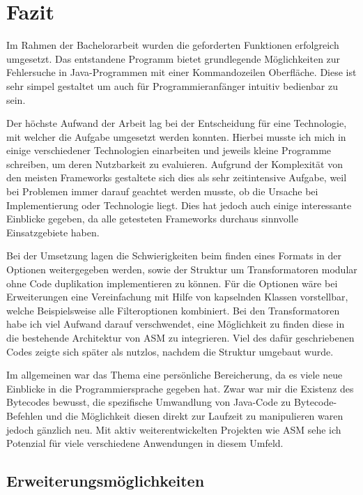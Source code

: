 
\chapter{Fazit}

Im Rahmen der Bachelorarbeit wurden die geforderten Funktionen erfolgreich umgesetzt. Das entstandene Programm bietet grundlegende Möglichkeiten zur Fehlersuche in Java-Programmen mit einer Kommandozeilen Oberfläche. Diese ist sehr simpel gestaltet um auch für Programmieranfänger intuitiv bedienbar zu sein.

Der höchste Aufwand der Arbeit lag bei der Entscheidung für eine Technologie, mit welcher die Aufgabe umgesetzt werden konnten. Hierbei musste ich mich in einige verschiedener Technologien einarbeiten und jeweils kleine Programme schreiben, um deren Nutzbarkeit zu evaluieren. Aufgrund der Komplexität von den meisten Frameworks gestaltete sich dies als sehr zeitintensive Aufgabe, weil bei Problemen immer darauf geachtet werden musste, ob die Ursache bei Implementierung oder Technologie liegt. Dies hat jedoch auch einige interessante Einblicke gegeben, da alle getesteten Frameworks durchaus sinnvolle Einsatzgebiete haben.

Bei der Umsetzung lagen die Schwierigkeiten beim finden eines Formats in der Optionen weitergegeben werden, sowie der Struktur um Transformatoren modular ohne Code duplikation implementieren zu können. Für die Optionen wäre bei Erweiterungen eine Vereinfachung mit Hilfe von kapselnden Klassen vorstellbar, welche Beispielsweise alle Filteroptionen kombiniert. Bei den Transformatoren habe ich viel Aufwand darauf verschwendet, eine Möglichkeit zu finden diese in die bestehende Architektur von ASM zu integrieren. Viel des dafür geschriebenen Codes zeigte sich später als nutzlos, nachdem die Struktur umgebaut wurde.

Im allgemeinen war das Thema eine persönliche Bereicherung, da es viele neue Einblicke in die Programmiersprache gegeben hat. Zwar war mir die Existenz des Bytecodes bewusst, die spezifische Umwandlung von Java-Code zu Bytecode-Befehlen und die Möglichkeit diesen direkt zur Laufzeit zu manipulieren waren jedoch gänzlich neu. Mit aktiv weiterentwickelten Projekten wie ASM sehe ich Potenzial für viele verschiedene Anwendungen in diesem Umfeld.

\section{Erweiterungsmöglichkeiten} 

